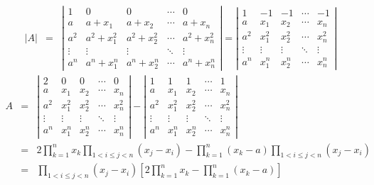 \begin{solution}
	\begin{eqnarray*}
		|A|&=&\left|\begin{matrix}
			1&0&0&\cdots&0\\
			a&a+x_{1}&a+x_{2}&\cdots&a+x_{n}\\
			a^2&a^2+x_{1}^2&a^2+x_{2}^2&\cdots&a^2+x_{n}^2\\
			\vdots&\vdots&\vdots&\ddots&\vdots\\
			a^n&a^n+x_{1}^n&a^n+x_{2}^n&\cdots&a^n+x_{n}^n
		\end{matrix} \right|
		=\left|\begin{matrix}
			1&-1&-1&\cdots&-1\\
			a&x_{1}&x_{2}&\cdots&x_{n}\\
			a^2&x_{1}^2&x_{2}^2&\cdots&x_{n}^2\\
			\vdots&\vdots&\vdots&\ddots&\vdots\\
			a^n&x_{1}^n&x_{2}^n&\cdots&x_{n}^n
		\end{matrix} \right|
	\end{eqnarray*}
	\begin{eqnarray*}
		A&=&\left|\begin{matrix}
			2&0&0&\cdots&0\\
			a&x_{1}&x_{2}&\cdots&x_{n}\\
			a^2&x_{1}^2&x_{2}^2&\cdots&x_{n}^2\\
			\vdots&\vdots&\vdots&\ddots&\vdots\\
			a^n&x_{1}^n&x_{2}^n&\cdots&x_{n}^n
		\end{matrix} \right|-\left|\begin{matrix}
			1&1&1&\cdots&1\\
			a&x_{1}&x_{2}&\cdots&x_{n}\\
			a^2&x_{1}^2&x_{2}^2&\cdots&x_{n}^2\\
			\vdots&\vdots&\vdots&\ddots&\vdots\\
			a^n&x_{1}^n&x_{2}^n&\cdots&x_{n}^n
		\end{matrix} \right|\\
		&=&2\prod\limits_{k=1}^{n}x_{k}\prod\limits_{1<i\leq j<n}(x_{j}-x_{i})-\prod\limits_{k=1}^{n}(x_{k}-a)\prod\limits_{1<i\leq j<n}(x_{j}-x_{i})\\
		&=&\prod\limits_{1<i\leq j<n}(x_{j}-x_{i})\left[ 2\prod\limits_{k=1}^{n}x_{k}-\prod\limits_{k=1}^{n}(x_{k}-a)\right] 
	\end{eqnarray*}
\end{solution}

